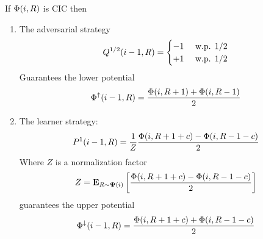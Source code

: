 \documentclass{article}[12pt]
\begin{document}
\begin{lemma} \label{lemma:first-order-bound}
  If $\Phi(i,R)$  is CIC then
  \begin{enumerate}
    \item The adversarial strategy
      \begin{equation} \label{eqn:adv-strat}
      Q^{1/2}(i-1,R) =
      \begin{cases}
        -1 & \mbox{ w.p. } 1/2\\
        +1 & \mbox{ w.p. } 1/2
      \end{cases}
    \end{equation}
    Guarantees the lower potential
 \begin{equation} \label{eqn:value-iteration-lower}
   \Phi^{\uparrow}(i-1, R) = \frac{\Phi(i,R+1) + \Phi(i,R-1)}{2}
 \end{equation}
   
    \item The learner strategy:
      \begin{equation} \label{eqn:learner-strat-1}
      P^1(i-1,R) = \frac{1}{Z} \frac{\Phi(i,R+1+c) - \Phi(i,R-1-c)}{2}
      \end{equation}
      Where $Z$ is a normalization factor
      $$Z = {\bf E}_{R \sim {\bf \Psi}(i)}\left[ \frac{\Phi(i,R+1+c) - \Phi(i,R-1-c)}{2} \right]$$
      guarantees the upper potential 
      \begin{equation} \label{eqn:value-iteration-upper}
        \Phi^{\downarrow}(i-1, R) = \frac{\Phi(i,R+1+c) + \Phi(i,R-1-c)}{2}
      \end{equation}
    \end{enumerate}
    
\end{lemma}
\end{document}
